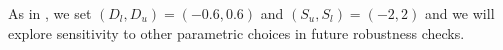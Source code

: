 As in \cite{Xie2016}, we set $(D_l, D_u)=(-0.6,0.6)$ and $(S_u,S_l)=(-2,2)$ and we will explore sensitivity to other parametric choices in future robustness checks.






